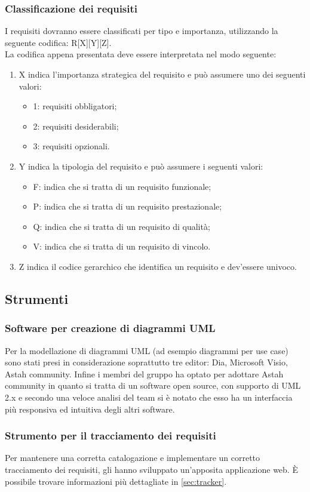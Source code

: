 			\subsubsection{Classificazione dei requisiti}
				I requisiti dovranno essere classificati per tipo e importanza, utilizzando la seguente codifica: R[X][Y][Z].\\
				La codifica appena presentata deve essere interpretata nel modo seguente:
				\begin{enumerate}
					\item X indica l'importanza strategica del requisito e può assumere uno dei seguenti valori:
					\begin{itemize}
						\item 1: requisiti obbligatori;
						\item 2: requisiti desiderabili;
						\item 3: requisiti opzionali.
					\end{itemize}
					\item Y indica la tipologia del requisito e può assumere i seguenti valori:
					\begin{itemize}
						\item F: indica che si tratta di un requisito funzionale;
						\item P: indica che si tratta di un requisito prestazionale;
						\item Q: indica che si tratta di un requisito di qualità;
						\item V: indica che si tratta di un requisito di vincolo.
					\end{itemize}
					\item Z indica il codice gerarchico che identifica un requisito e dev'essere univoco.
				\end{enumerate}
		\subsection{Strumenti}
			\subsubsection{Software per creazione di diagrammi UML}
			Per la modellazione di diagrammi UML (ad esempio diagrammi per use case) sono stati presi in considerazione soprattutto tre editor: Dia, Microsoft Visio, Astah community. Infine i membri del gruppo \groupname{} ha optato per adottare Astah community in quanto si tratta di un software open source, con supporto di UML 2.x e secondo una veloce analisi del team si è notato che esso ha un interfaccia più responsiva ed intuitiva degli altri software.
			\subsubsection{Strumento per il tracciamento dei requisiti}
			Per mantenere una corretta catalogazione e implementare un corretto tracciamento dei requisiti, gli  hanno sviluppato un'apposita applicazione web. È possibile trovare informazioni più dettagliate in \autoref{sec:tracker}.